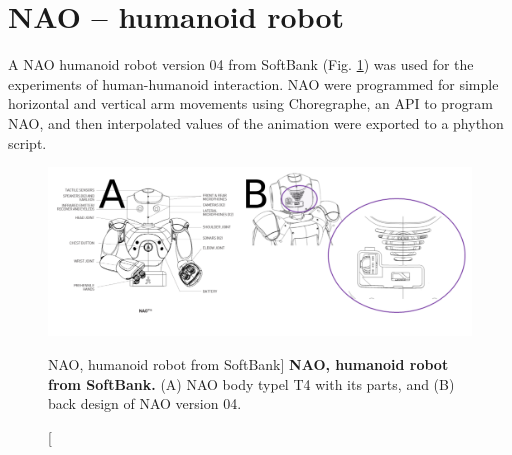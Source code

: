 \section{NAO -- humanoid robot}  \label{appendix:nao}
A NAO humanoid robot version 04 from SoftBank (Fig. \ref{fig:nao})
was used for the experiments of human-humanoid interaction. 
NAO were programmed for simple horizontal and vertical arm movements
using Choregraphe, an API to program NAO, and then 
interpolated values of the animation were exported 
to a phython script.
\begin{figure}
 \centering
   \includegraphics[width=1.0\textwidth]{nao}
   \caption
	[NAO, humanoid robot from SoftBank]{
	{\bf NAO, humanoid robot from SoftBank.}
		(A) NAO body typel T4 with its parts, and 
		(B) back design of NAO version 04.
}
   \label{fig:nao}
\end{figure}

